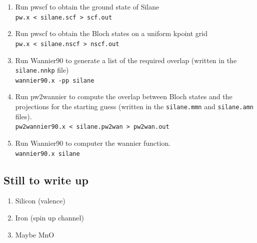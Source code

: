 \documentclass[a4paper,11pt,twoside]{article}
\begin{document}
\begin{enumerate}
\item Run pwscf to obtain the ground state of Silane\\
{\tt pw.x < silane.scf > scf.out}

\item Run pwscf to obtain the Bloch states on a uniform kpoint grid\\
{\tt pw.x < silane.nscf > nscf.out}

\item Run Wannier90 to generate a list of the required overlap (written in the {\tt silane.nnkp} file)\\
{\tt wannier90.x -pp silane}

\item Run pw2wannier to compute the overlap between Bloch states and the projections for the starting guess (written
in the {\tt silane.mmn} and {\tt silane.amn} files).\\
{\tt pw2wannier90.x < silane.pw2wan > pw2wan.out}

\item Run Wannier90 to computer the wannier function.\\
{\tt wannier90.x silane}

\end{enumerate}

\subsection{Still to write up}

\begin{enumerate}

\item Silicon (valence)

\item Iron (spin up channel)

\item Maybe MnO

\end{enumerate}
\end{document}

